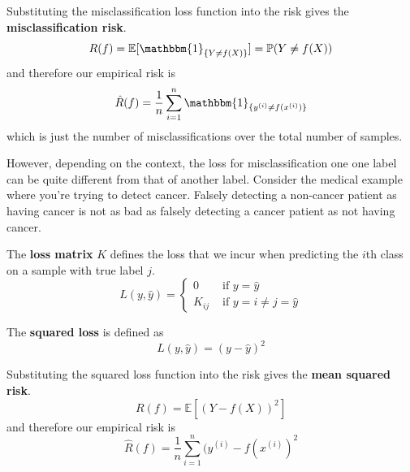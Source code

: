 \documentclass{article}
\begin{document}
    \begin{example}
      Substituting the misclassification loss function into the risk gives the \textbf{misclassification risk}. 
      \begin{equation}
        R(f) = \mathbb{E} [\mathbbm{1}_{\{Y \neq f(X)\}}] = \mathbb{P}(Y \neq f(X)) 
      \end{equation}
      and therefore our empirical risk is 
      \begin{equation}
        \hat{R} (f) = \frac{1}{n} \sum_{i=1}^n \mathbbm{1}_{\{y^{(i)} \neq f(x^{(i)})\}}
      \end{equation}
      which is just the number of misclassifications over the total number of samples. 
    \end{example}

    However, depending on the context, the loss for misclassification one one label can be quite different from that of another label. Consider the medical example where you're trying to detect cancer. Falsely detecting a non-cancer patient as having cancer is not as bad as falsely detecting a cancer patient as not having cancer. 

    \begin{definition}
      The \textbf{loss matrix} $K$ defines the loss that we incur when predicting the $i$th class on a sample with true label $j$. 
      \begin{equation}
        L(y, \hat{y}) = \begin{cases} 0 & \text{ if } y = \hat{y} \\ K_{ij} & \text{ if } y = i \neq j = \hat{y} \end{cases}
      \end{equation}
    \end{definition}

    \begin{definition}
      The \textbf{squared loss} is defined as 
      \begin{equation}
        L(y, \hat{y}) = (y - \hat{y})^2
      \end{equation}
    \end{definition}

    \begin{example}
      Substituting the squared loss function into the risk gives the \textbf{mean squared risk}. 
      \begin{equation}
        R(f) = \mathbb{E}[(Y - f(X))^2]
      \end{equation}
      and therefore our empirical risk is 
      \begin{equation}
        \hat{R} (f) = \frac{1}{n} \sum_{i=1}^n (y^{(i)} - f(x^{(i)})^2
      \end{equation}
    \end{example}
\end{document}
